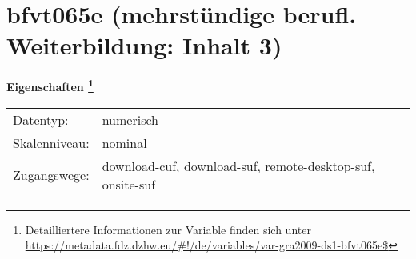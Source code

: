 
    \setcounter{footnote}{0}

    \vspace*{-1.8cm}
	\section{bfvt065e (mehrstündige berufl. Weiterbildung: Inhalt 3)}
	\label{section:bfvt065e}



    \vspace*{0.5cm}
    \noindent\textbf{Eigenschaften
	\footnote{Detailliertere Informationen zur Variable finden sich unter
		\url{https://metadata.fdz.dzhw.eu/\#!/de/variables/var-gra2009-ds1-bfvt065e$}}}\\
	\begin{tabularx}{\hsize}{@{}lX}
	Datentyp: & numerisch \\
	Skalenniveau: & nominal \\
	Zugangswege: &
	  download-cuf, 
	  download-suf, 
	  remote-desktop-suf, 
	  onsite-suf
 \\
    \end{tabularx}



